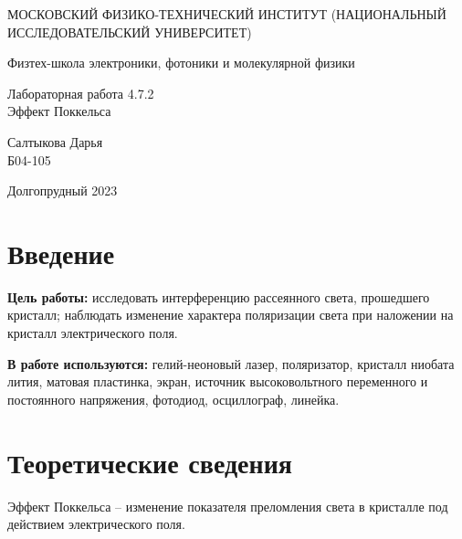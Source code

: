 \documentclass[a4paper,12pt]{article} %
\begin{document}
	
	\begin{titlepage}
	\begin{center}
		{\large МОСКОВСКИЙ ФИЗИКО-ТЕХНИЧЕСКИЙ ИНСТИТУТ (НАЦИОНАЛЬНЫЙ ИССЛЕДОВАТЕЛЬСКИЙ УНИВЕРСИТЕТ)}
	\end{center}
	\begin{center}
		{\large Физтех-школа электроники, фотоники и молекулярной физики}
	\end{center}
	
	
	\vspace{4.5cm}
	{\huge
		\begin{center}
			{Лабораторная работа 4.7.2}\\
			Эффект Поккельса
		\end{center}
	}
	\vspace{2cm}
	\begin{flushright}
		{\LARGE Салтыкова Дарья \\
			\vspace{0.5cm}
			Б04-105}
	\end{flushright}
	\vspace{8cm}
	\begin{center}
		Долгопрудный 2023
	\end{center}
\end{titlepage}

\section{Введение}

\noindent
\textbf{Цель работы:} исследовать интерференцию рассеянного света,
прошедшего кристалл; наблюдать изменение характера поляризации света при наложении на кристалл электрического поля.
\medskip

\noindent \textbf{В работе используются:} гелий-неоновый лазер, поляризатор,
кристалл ниобата лития, матовая пластинка, экран, источник высоковольтного переменного и постоянного напряжения, фотодиод, осциллограф, линейка.

\medskip

\section{Теоретические сведения}

\noindent Эффект Поккельса -- изменение показателя преломления света в кристалле под действием электрического поля.\\

\medskip
\end{document}
